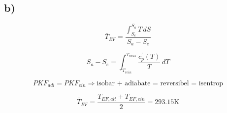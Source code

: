 

\subsection*{b)}

\[
\bar{T}_{EF} = \frac{\int_{S_e}^{S_a} T \, dS}{S_a - S_e}
\]


\[
S_a - S_e = \int_{T_{rein}}^{T_{raus}} \frac{c_p^\prime (T)}{T} \, dT
\]

\[
PKF_{adi} = PKF_{ein} \Rightarrow \text{isobar + adiabate = reversibel = isentrop}
\]

\[
\bar{T}_{EF} = \frac{T_{EF,alt} + T_{EF,ein}}{2} = 293.15 \text{K}
\]